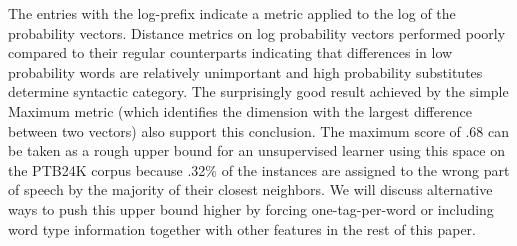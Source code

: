 The entries with the log-prefix indicate a metric applied to the log
of the probability vectors.  Distance metrics on log probability
vectors performed poorly compared to their regular counterparts
indicating that differences in low probability words are relatively
unimportant and high probability substitutes determine syntactic
category.  The surprisingly good result achieved by the simple Maximum
metric (which identifies the dimension with the largest difference
between two vectors) also support this conclusion.  The maximum score
of .68 can be taken as a rough upper bound for an unsupervised
learner using this space on the PTB24K corpus because .32\% of the
instances are assigned to the wrong part of speech by the majority of
their closest neighbors.  We will discuss alternative ways to push
this upper bound higher by forcing one-tag-per-word or including word
type information together with other features in the rest of this
paper.


